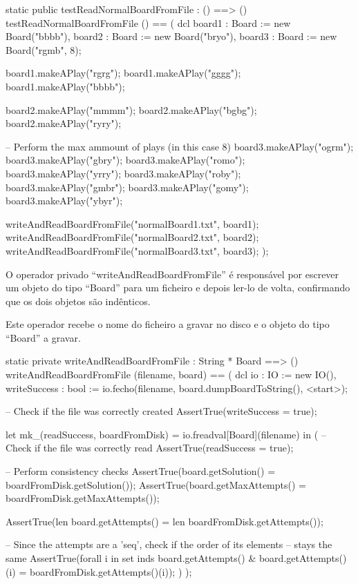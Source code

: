 \begin{vdm_al}  
    static public testReadNormalBoardFromFile : () ==> ()
    testReadNormalBoardFromFile () == (
      dcl board1 : Board := new Board("bbbb"),
        board2 : Board := new Board("bryo"),
        board3 : Board := new Board("rgmb", 8);
  
        board1.makeAPlay("rgrg");
        board1.makeAPlay("gggg");
        board1.makeAPlay("bbbb");
  
        board2.makeAPlay("mmmm");
        board2.makeAPlay("bgbg");
        board2.makeAPlay("ryry");
  
        -- Perform the max ammount of plays (in this case 8)
        board3.makeAPlay("ogrm");
        board3.makeAPlay("gbry");
        board3.makeAPlay("romo");
        board3.makeAPlay("yrry");
        board3.makeAPlay("roby");
        board3.makeAPlay("gmbr");
        board3.makeAPlay("gomy");
        board3.makeAPlay("ybyr");
  
        writeAndReadBoardFromFile("normalBoard1.txt", board1);
        writeAndReadBoardFromFile("normalBoard2.txt", board2);
        writeAndReadBoardFromFile("normalBoard3.txt", board3);
      );
\end{vdm_al}  
 
O operador privado ``writeAndReadBoardFromFile'' é responsável por
escrever um objeto do tipo ``Board'' para um ficheiro e depois ler-lo
de volta, confirmando que os dois objetos são indênticos.

Este operador recebe o nome do ficheiro a gravar no disco e o objeto
do tipo ``Board'' a gravar.

\begin{vdm_al} 
    static private writeAndReadBoardFromFile : String * Board ==> ()
    writeAndReadBoardFromFile (filename, board) == (
      dcl io : IO := new IO(),
      writeSuccess : bool := io.fecho(filename, board.dumpBoardToString(), <start>);
  
      -- Check if the file was correctly created
      AssertTrue(writeSuccess = true);
  
      let mk_(readSuccess, boardFromDisk) = io.freadval[Board](filename) in (
        -- Check if the file was correctly read
        AssertTrue(readSuccess = true);
  
        -- Perform consistency checks
        AssertTrue(board.getSolution() = boardFromDisk.getSolution());
        AssertTrue(board.getMaxAttempts() = boardFromDisk.getMaxAttempts());
  
        AssertTrue(len board.getAttempts() = len boardFromDisk.getAttempts());
  
        -- Since the attempts are a 'seq', check if the order of its elements
        -- stays the same
        AssertTrue(forall i in set inds board.getAttempts() &
          board.getAttempts()(i) = boardFromDisk.getAttempts()(i));
      )
    );
\end{vdm_al}

